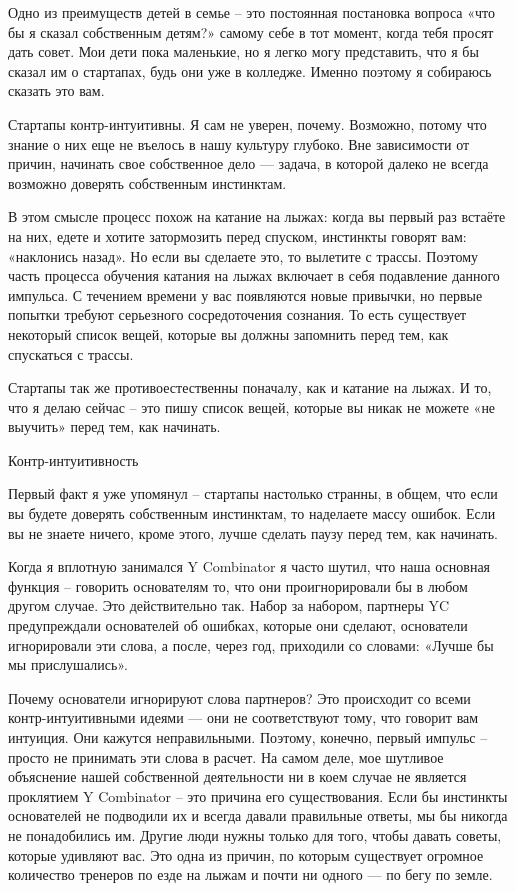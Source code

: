\documentclass[ebook,12pt,oneside,openany]{memoir}
\begin{document}
\maketitle

Одно из преимуществ детей в семье – это постоянная постановка вопроса
«что бы я сказал собственным детям?» самому себе в тот момент, когда
тебя просят дать совет. Мои дети пока маленькие, но я легко могу
представить, что я бы сказал им о стартапах, будь они уже в колледже.
Именно поэтому я собираюсь сказать это вам.

Стартапы контр-интуитивны. Я сам не уверен, почему. Возможно, потому
что знание о них еще не въелось в нашу культуру глубоко. Вне
зависимости от причин, начинать свое собственное дело — задача, в
которой далеко не всегда возможно доверять собственным инстинктам.

В этом смысле процесс похож на катание на лыжах: когда вы первый раз
встаёте на них, едете и хотите затормозить перед спуском, инстинкты
говорят вам: «наклонись назад». Но если вы сделаете это, то вылетите с
трассы. Поэтому часть процесса обучения катания на лыжах включает в
себя подавление данного импульса. С течением времени у вас появляются
новые привычки, но первые попытки требуют серьезного сосредоточения
сознания. То есть существует некоторый список вещей, которые вы должны
запомнить перед тем, как спускаться с трассы.

Стартапы так же противоестественны поначалу, как и катание на лыжах. И
то, что я делаю сейчас – это пишу список вещей, которые вы никак не
можете «не выучить» перед тем, как начинать.

Контр-интуитивность

Первый факт я уже упомянул – стартапы настолько странны, в общем, что
если вы будете доверять собственным инстинктам, то наделаете массу
ошибок. Если вы не знаете ничего, кроме этого, лучше сделать паузу
перед тем, как начинать.

Когда я вплотную занимался Y Combinator я часто шутил, что наша
основная функция – говорить основателям то, что они проигнорировали бы
в любом другом случае. Это действительно так. Набор за набором,
партнеры YC предупреждали основателей об ошибках, которые они сделают,
основатели игнорировали эти слова, а после, через год, приходили со
словами: «Лучше бы мы прислушались».

Почему основатели игнорируют слова партнеров? Это происходит со всеми
контр-интуитивными идеями — они не соответствуют тому, что говорит вам
интуиция. Они кажутся неправильными. Поэтому, конечно, первый импульс
– просто не принимать эти слова в расчет. На самом деле, мое шутливое
объяснение нашей собственной деятельности ни в коем случае не является
проклятием Y Combinator – это причина его существования. Если бы
инстинкты основателей не подводили их и всегда давали правильные
ответы, мы бы никогда не понадобились им. Другие люди нужны только для
того, чтобы давать советы, которые удивляют вас. Это одна из причин,
по которым существует огромное количество тренеров по езде на лыжам и
почти ни одного — по бегу по земле.
\end{document}
